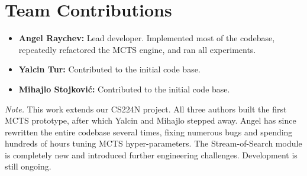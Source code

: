 \documentclass{article}
\begin{document}
\section{Team Contributions}
\begin{itemize}
  \item \textbf{Angel Raychev:} Lead developer. Implemented most of the codebase, repeatedly refactored the MCTS engine, and ran all experiments.
  \item \textbf{Yalcin Tur:} Contributed to the initial code base.
  \item \textbf{Mihajlo Stojković:} Contributed to the initial code base.
\end{itemize}

\noindent\textit{Note.}  
This work extends our CS224N project. All three authors built the first
MCTS prototype, after which Yalcin and Mihajlo stepped away.  
Angel has since rewritten the entire codebase several times, fixing
numerous bugs and spending hundreds of hours tuning MCTS
hyper-parameters.  
The Stream-of-Search module is completely new and introduced further
engineering challenges. Development is still ongoing.





\end{document}
